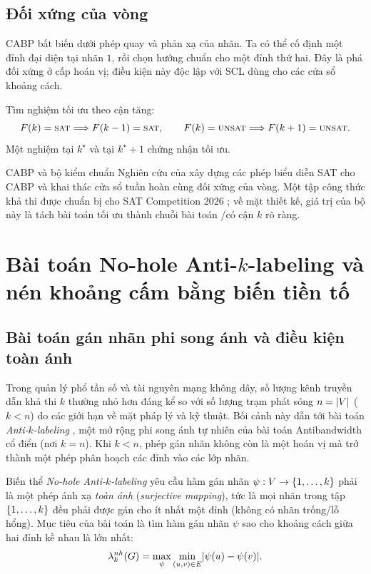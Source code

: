 \subsection{Đối xứng của vòng}

CABP bất biến dưới phép quay và phản xạ của nhãn. Ta có thể cố định một đỉnh
đại diện tại nhãn \(1\), rồi chọn hướng chuẩn cho một đỉnh thứ hai. Đây là phá
đối xứng ở cấp hoán vị; điều kiện này độc lập với SCL dùng cho các cửa sổ khoảng cách.

Tìm nghiệm tối ưu theo cận tăng:
\[
  F(k)=\textsc{sat} \Longrightarrow F(k-1)=\textsc{sat},
  \qquad
  F(k)=\textsc{unsat} \Longrightarrow F(k+1)=\textsc{unsat}.
\]
Một nghiệm tại \(k^\star\) và \UNSAT tại \(k^\star+1\) chứng nhận tối ưu.

\begin{resultbox}{CABP và bộ kiểm chuẩn}
Nghiên cứu của \textcite{truong2026cabp} xây dựng các phép biểu diễn SAT cho CABP
và khai thác cửa sổ tuần hoàn cùng đối xứng của vòng. Một tập công thức khả thi được
chuẩn bị cho SAT Competition 2026 \parencite{truong2026competition}; về mặt
thiết kế, giá trị của bộ này là tách bài toán tối ưu thành chuỗi bài toán
\SAT/\UNSAT có cận \(k\) rõ ràng.
\end{resultbox}

\section{Bài toán No-hole Anti-\(k\)-labeling và nén khoảng cấm bằng biến tiền tố}


\subsection{Bài toán gán nhãn phi song ánh và điều kiện toàn ánh}

Trong quản lý phổ tần số và tài nguyên mạng không dây, số lượng kênh truyền dẫn khả thi \(k\) thường nhỏ hơn đáng kể so với số lượng trạm phát sóng \(n = \lvert V\rvert\) (\(k < n\)) do các giới hạn về mặt pháp lý và kỹ thuật. Bối cảnh này dẫn tới bài toán \emph{Anti-\(k\)-labeling} \parencite{guan2019anti}, một mở rộng phi song ánh tự nhiên của bài toán Antibandwidth cổ điển (nơi \(k=n\)). Khi \(k < n\), phép gán nhãn không còn là một hoán vị mà trở thành một phép phân hoạch các đỉnh vào các lớp nhãn.

Biến thể \emph{No-hole Anti-\(k\)-labeling} \parencite{wang2021anti,hai2026nohole} yêu cầu hàm gán nhãn \(\psi: V \to \left\{1,\ldots,k\right\}\) phải là một phép ánh xạ \emph{toàn ánh} (\emph{surjective mapping}), tức là mọi nhãn trong tập \(\left\{1,\ldots,k\right\}\) đều phải được gán cho ít nhất một đỉnh (không có nhãn trống/lỗ hổng). Mục tiêu của bài toán là tìm hàm gán nhãn \(\psi\) sao cho khoảng cách giữa hai đỉnh kề nhau là lớn nhất:
\begin{equation}
  \lambda_k^{nh}(G) = \max_{\psi} \min_{(u,v)\in E} \lvert \psi(u) - \psi(v)\rvert.
  \label{eq:nohole-objective}
\end{equation}

